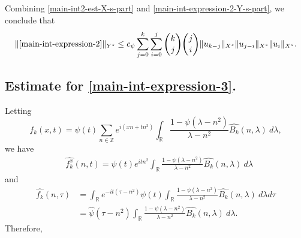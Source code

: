 \documentclass[12pt,reqno]{amsart}
\numberwithin{equation}{section}  %
\numberwithin{figure}{section}
\newcommand{\rr}{\mathbb{R}}
\newcommand{\zz}{\mathbb{Z}}
\newcommand{\wh}{\widehat}
\theoremstyle{plain}
\theoremstyle{definition}
\theoremstyle{remark}
\begin{document}
%
%
Combining \eqref{main-int2-est-X-s-part} and
\eqref{main-int-expression-2-Y-s-part}, we conclude that
%
%
%
%
\begin{equation}
  \label{main-int2-est}
  \begin{split}
    \|\eqref{main-int-expression-2}\|_{Y^s} \le c_{\psi}
    \sum_{j=0}^{k} \sum_{i=0}^{j} {k \choose j}{j \choose i}
    \|u_{k-j}\|_{X^s} \| u_{j-i}\|_{X^s}
    \| u_i \|_{X^s}.
  \end{split}
\end{equation}
%
%
\subsection{Estimate for \eqref{main-int-expression-3}.}
Letting $$f_k(x,t) = \psi(t) \sum_{n \in \zz} e^{i\left( xn + tn^{2} \right)} 
\int_\rr \frac{1 - \psi\left( \lambda - n^{2} \right)}{\lambda - n^{2}} 
\wh{{B_k}} \left( n, \lambda \right) \ d \lambda,$$ we have
%
%
\begin{equation*}
  \begin{split}
    & \wh{f_k^x}(n, t) = \psi(t) e^{itn^{2}} \int_\rr
    \frac{1 - \psi\left( \lambda - n^{2} \right)}{\lambda - n^{2}} 
    \wh{{B_k}}(n, \lambda) \ d \lambda
  \end{split}
\end{equation*}
and
\begin{equation*}
  \begin{split}
     \wh{f_k}\left( n, \tau \right)
     & = \int_\rr e^{-it\left( \tau - n^{2} 
    \right)} \psi(t) \int_\rr \frac{1 - \psi\left( 
    \lambda - n^{2} 
    \right)}{\lambda - n^{2}} \wh{{B_k}}(n, \lambda) \ d \lambda d \tau
    \\
    & = \wh{\psi}\left( \tau - n^{2} \right) \int_\rr 
    \frac{1 - \psi\left( 
    \lambda - n^{2} 
    \right)}{\lambda - n^{2}} \wh{{B_k}}(n, \lambda) \ d \lambda.
  \end{split}
\end{equation*}
Therefore,
%
%
\end{document}
